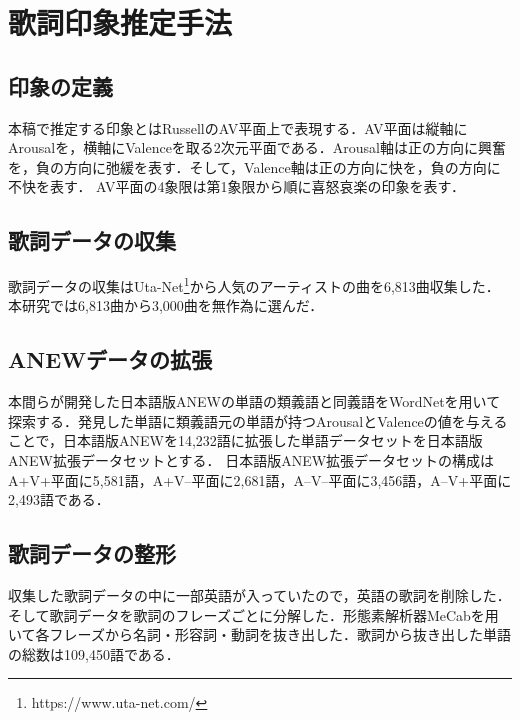 \documentclass[a4paper,10pt,twocolumn]{jsarticle}
\begin{document}
\section{歌詞印象推定手法}
\subsection{印象の定義}
本稿で推定する印象とはRussellのAV平面上で表現する．AV平面は縦軸にArousalを，横軸にValenceを取る2次元平面である．Arousal軸は正の方向に興奮を，負の方向に弛緩を表す．そして，Valence軸は正の方向に快を，負の方向に不快を表す．
AV平面の4象限は第1象限から順に喜怒哀楽の印象を表す．

\subsection{歌詞データの収集}
歌詞データの収集はUta-Net\footnote{https://www.uta-net.com/}から人気のアーティストの曲を6,813曲収集した．本研究では6,813曲から3,000曲を無作為に選んだ．

\subsection{ANEWデータの拡張}
本間らが開発した日本語版ANEWの単語の類義語と同義語をWordNet\cite{10}を用いて探索する．発見した単語に類義語元の単語が持つArousalとValenceの値を与えることで，日本語版ANEWを14,232語に拡張した単語データセットを日本語版ANEW拡張データセットとする．
日本語版ANEW拡張データセットの構成はA+V+平面に5,581語，A+V--平面に2,681語，A--V--平面に3,456語，A--V+平面に2,493語である．

\subsection{歌詞データの整形}
収集した歌詞データの中に一部英語が入っていたので，英語の歌詞を削除した．そして歌詞データを歌詞のフレーズごとに分解した．形態素解析器MeCabを用いて各フレーズから名詞・形容詞・動詞を抜き出した．歌詞から抜き出した単語の総数は109,450語である．
\end{document}
